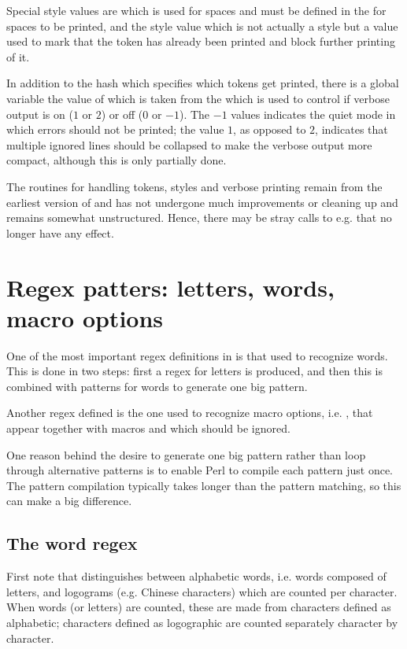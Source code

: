 \documentclass{article}
\begin{document}
Special style values are  which is used for spaces and must be defined in the  for spaces to be printed, and the  style value which is not actually a style but a value used to mark that the token has already been printed and block further printing of it.

In addition to the  hash which specifies which tokens get printed, there is a global variable  the value of which is taken from the  which is used to control if verbose output is on ($1$ or $2$) or off ($0$ or $-1$). The $-1$ values indicates the quiet mode in which errors should not be printed; the value $1$, as opposed to $2$, indicates that multiple ignored lines should be collapsed to make the verbose output more compact, although this is only partially done.

The routines for handling tokens, styles and verbose printing remain from the earliest version of \TeXcount{} and has not undergone much improvements or cleaning up and remains somewhat unstructured. Hence, there may be stray calls to e.g.  that no longer have any effect.



\section{Regex patters: letters, words, macro options}

One of the most important regex definitions in \TeXcount{} is that used to recognize words. This is done in two steps: first a regex for letters is produced, and then this is combined with patterns for words to generate one big pattern.

Another regex defined is the one used to recognize macro options, i.e. \code{[\ldots]}, that appear together with macros and which should be ignored.

One reason behind the desire to generate one big pattern rather than loop through alternative patterns is to enable Perl to compile each pattern just once. The pattern compilation typically takes longer than the pattern matching, so this can make a big difference.


\subsection{The word regex}

First note that \TeXcount{} distinguishes between alphabetic words, i.e. words composed of letters, and logograms (e.g. Chinese characters) which are counted per character. When words (or letters) are counted, these are made from characters defined as alphabetic; characters defined as logographic are counted separately character by character.
\end{document}
